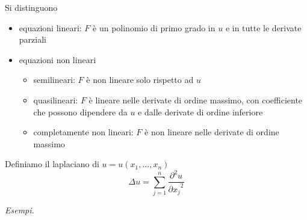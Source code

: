 \documentclass[10pt,a4paper,twoside,openright]{book}
\begin{document}
Si distinguono
\begin{itemize}
\item equazioni lineari: $F$ è un polinomio di primo grado in $u$ e in tutte le derivate parziali
\item equazioni non lineari
\begin{itemize}
\item semilineari: $F$ è non lineare solo rispetto ad $u$
\item quasilineari: $F$ è lineare nelle derivate di ordine massimo, con coefficiente che possono dipendere da $u$ e dalle derivate di ordine inferiore
\item completamente non lineari: $F$ è non lineare nelle derivate di ordine massimo
\end{itemize}
\end{itemize}
\begin{definition}
[Laplaciano] Definiamo il laplaciano di $\displaystyle u=u( x_{1},\dotsc,x_{n})$
\begin{equation*}
\Delta u=\sum ^{n}_{j=1}\frac{\partial ^{2} u}{{\partial x_{j}}^{2}}
\end{equation*}
\end{definition}
\textit{Esempi.}
\end{document}
